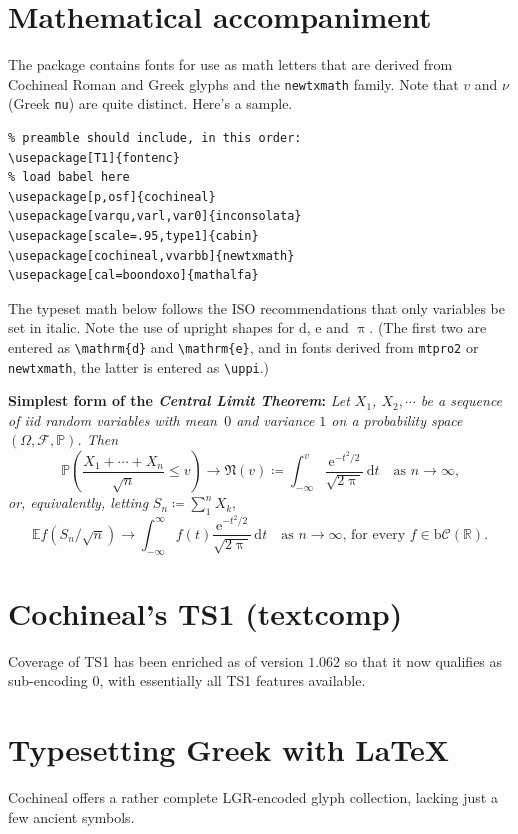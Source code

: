 \documentclass[11pt]{article}
\begin{document}
\section*{Mathematical accompaniment}
The package contains fonts for use as math letters that are derived from Cochineal Roman and Greek glyphs and the {\tt newtxmath} family. Note that $v$ and $\nu$ (Greek {\tt nu}) are quite distinct. Here's a sample.

\begin{verbatim}
% preamble should include, in this order:
\usepackage[T1]{fontenc}
% load babel here
\usepackage[p,osf]{cochineal}
\usepackage[varqu,varl,var0]{inconsolata}
\usepackage[scale=.95,type1]{cabin}
\usepackage[cochineal,vvarbb]{newtxmath}
\usepackage[cal=boondoxo]{mathalfa}
\end{verbatim}
\def\Pr{\ensuremath{\mathbb{P}}}
\def\d{\mathrm{d}}
The typeset math below follows the ISO recommendations that only variables
be set in italic. Note the use of upright shapes for $\d$, $\mathrm{e}$
and $\uppi$. (The first two are entered as \verb|\mathrm{d}| and
\verb|\mathrm{e}|, and in fonts derived from {\tt mtpro2} or {\tt newtxmath},
 the latter is entered as \verb|\uppi|.)

\textbf{Simplest form of the \textit{Central Limit Theorem}:} \textit{Let
$X_1$, $X_2,\cdots$ be a sequence of iid random variables with mean~$0$ 
and variance $1$ on a probability space $(\Omega,\mathcal{F},\Pr)$. Then}
\[\Pr\left(\frac{X_1+\cdots+X_n}{\sqrt{n}}\le v\right)\to\mathfrak{N}(v)\coloneq
\int_{-\infty}^v \frac{\mathrm{e}^{-t^2/2}}{\sqrt{2\uppi}}\,
\mathrm{d}t\quad\mbox{as $n\to\infty$,}\]
\textit{or, equivalently, letting} $S_n\coloneq\sum_1^n X_k$,
\[\mathbb{E} f\left(S_n/\sqrt{n}\right)\to \int_{-\infty}^\infty f(t)
\frac{\mathrm{e}^{-t^2/2}}{\sqrt{2\uppi}}\,\mathrm{d}t
\quad\mbox{as $n\to\infty$, for every $f\in\mathrm{b}
\mathcal{C}(\mathbb{R})$.}\]
\newpage

\section*{Cochineal's TS1 (textcomp)}
Coverage of TS1 has been enriched as of version $1.062$ so that it now qualifies as sub-encoding $0$, with essentially all TS1 features available.

\newpage
 \section*{Typesetting Greek with LaTeX}
Cochineal offers a rather complete LGR-encoded glyph collection, lacking just a few ancient symbols.
\end{document}
